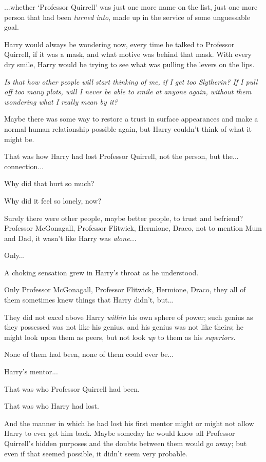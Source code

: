 ...whether `Professor Quirrell' was just one more name on the list, just one more person that had been \emph{turned into}, made up in the service of some unguessable goal.

Harry would always be wondering now, every time he talked to Professor Quirrell, if it was a mask, and what motive was behind that mask. With every dry smile, Harry would be trying to see what was pulling the levers on the lips.

\emph{Is that how other people will start thinking of me, if I get too Slytherin? If I pull off too many plots, will I never be able to smile at anyone again, without them wondering what I really mean by it?}

Maybe there was some way to restore a trust in surface appearances and make a normal human relationship possible again, but Harry couldn't think of what it might be.

That was how Harry had lost Professor Quirrell, not the person, but the... connection...

Why did that hurt so much?

Why did it feel so lonely, now?

Surely there were other people, maybe better people, to trust and befriend? Professor McGonagall, Professor Flitwick, Hermione, Draco, not to mention Mum and Dad, it wasn't like Harry was \emph{alone...}

Only...

A choking sensation grew in Harry's throat as he understood.

Only Professor McGonagall, Professor Flitwick, Hermione, Draco, they all of them sometimes knew things that Harry didn't, but...

They did not excel above Harry \emph{within} his own sphere of power; such genius as they possessed was not like his genius, and his genius was not like theirs; he might look upon them as peers, but not look \emph{up} to them as his \emph{superiors.}

None of them had been, none of them could ever be...

Harry's mentor...

That was who Professor Quirrell had been.

That was who Harry had lost.

And the manner in which he had lost his first mentor might or might not allow Harry to ever get him back. Maybe someday he would know all Professor Quirrell's hidden purposes and the doubts between them would go away; but even if that seemed possible, it didn't seem very probable.

